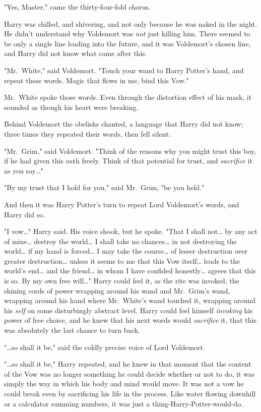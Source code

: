 "Yes, Master," came the thirty-four-fold chorus.

Harry was chilled, and shivering, and not only because he was naked in the
night. He didn't understand why Voldemort was \emph{not} just killing him.
There seemed to be only a single line leading into the future, and it was
Voldemort's chosen line, and Harry did not know what came after this.

"Mr.~White," said Voldemort. "Touch your wand to Harry Potter's hand, and
repeat these words. Magic that flows in me, bind this Vow."

Mr.~White spoke those words. Even through the distortion effect of his mask, it
sounded as though his heart were breaking.

Behind Voldemort the obelisks chanted, a language that Harry did not know;
three times they repeated their words, then fell silent.

"Mr.~Grim," said Voldemort. "Think of the reasons why you might trust this boy,
if he had given this oath freely. Think of that potential for trust, and
\emph{sacrifice} it as you say{\ldots}"

"By my trust that I hold for you," said Mr.~Grim, "be you held."

And then it was Harry Potter's turn to repeat Lord Voldemort's words, and Harry
did so.

"I vow{\ldots}" Harry said. His voice shook, but he spoke. "That I shall
not{\ldots} by any act of mine{\ldots} destroy the world{\ldots} I shall take
no chances{\ldots} in not destroying the world{\ldots} if my hand is
forced{\ldots} I may take the course{\ldots} of lesser destruction over greater
destruction{\ldots} unless it seems to me that this Vow itself{\ldots} leads to
the world's end{\ldots} and the friend{\ldots} in whom I have confided
honestly{\ldots} agrees that this is so. By my own free will{\ldots}" Harry
could feel it, as the rite was invoked, the shining cords of power wrapping
around his wand and Mr.~Grim's wand, wrapping around his hand where Mr.~White's
wand touched it, wrapping around his \emph{self} on some disturbingly abstract
level. Harry could feel himself \emph{invoking} his power of free choice, and
he knew that his next words would \emph{sacrifice} it, that this was absolutely
the last chance to turn back.

"{\ldots}so shall it be," said the coldly precise voice of Lord Voldemort.

"{\ldots}so shall it be," Harry repeated, and he knew in that moment that the
content of the Vow was no longer something he could decide whether or not to
do, it was simply the way in which his body and mind would move. It was not a
vow he could break even by sacrificing his life in the process. Like water
flowing downhill or a calculator summing numbers, it was just a
thing-Harry-Potter-would-do.

